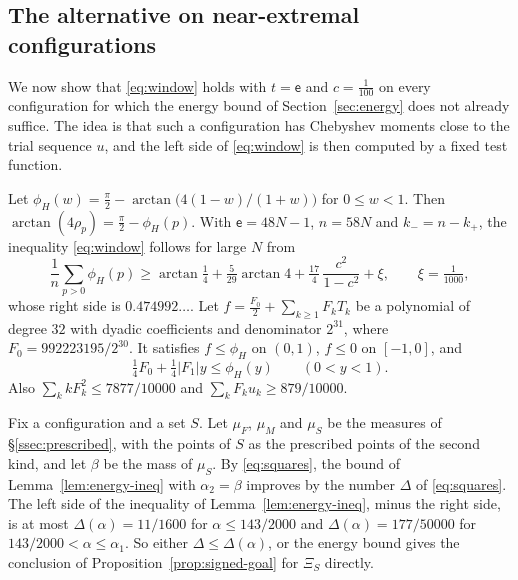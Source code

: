 \documentclass[11pt]{amsart}
\theoremstyle{definition}
\theoremstyle{remark}
\numberwithin{equation}{section}
\begin{document}
\subsection{The alternative on near-extremal configurations}\label{ssec:alternative}
We now show that \eqref{eq:window} holds with $t=\mathsf e$ and $c=\frac1{100}$ on every configuration for which the
energy bound of Section~\ref{sec:energy} does not already suffice. The idea is that such a configuration has
Chebyshev moments close to the trial sequence $u$, and the left side of \eqref{eq:window} is then computed by a
fixed test function.

Let $\phi_H(w)=\frac\pi2-\arctan\bigl(4(1-w)/(1+w)\bigr)$ for $0\le w<1$. Then $\arctan(4\rho_p)=\frac\pi2-\phi_H(p)$.
With $\mathsf e=48N-1$, $n=58N$ and $k_-=n-k_+$, the inequality \eqref{eq:window} follows for large $N$ from
\begin{equation}\label{eq:phaseneed}
 \frac1n\sum_{p>0}\phi_H(p)\ge\arctan\tfrac14+\tfrac5{29}\arctan4+\tfrac{17}4\,\frac{c^2}{1-c^2}+\xi,\qquad \xi=\tfrac1{1000},
\end{equation}
whose right side is $0.474992\ldots$. Let $f=\frac{F_0}2+\sum_{k\ge1}F_kT_k$ be a polynomial of degree $32$ with
dyadic coefficients and denominator $2^{31}$, where $F_0=992223195/2^{30}$. 
It satisfies $f\le\phi_H$ on $(0,1)$, $f\le0$ on $[-1,0]$, and
\begin{equation}\label{eq:testS}
 \tfrac14F_0+\tfrac14|F_1|y\le\phi_H(y)\qquad(0<y<1).
\end{equation}
Also $\sum_kkF_k^2\le7877/10000$ and $\sum_kF_ku_k\ge879/10000$.

Fix a configuration and a set $S$. Let $\mu_F$, $\mu_M$ and $\mu_S$ be the measures of \S\ref{ssec:prescribed}, with the points of $S$ as the
prescribed points of the second kind, and let $\beta$ be the mass of $\mu_S$. By \eqref{eq:squares}, the bound of Lemma~\ref{lem:energy-ineq} with
$\alpha_2=\beta$ improves by the number $\Delta$ of \eqref{eq:squares}. The left side of the inequality of Lemma~\ref{lem:energy-ineq}, minus the right
side, is at most $\Delta(\alpha)=11/1600$ for $\alpha\le143/2000$ and $\Delta(\alpha)=177/50000$ for
$143/2000<\alpha\le\alpha_1$. So either $\Delta\le\Delta(\alpha)$, or the energy bound gives the conclusion of
Proposition~\ref{prop:signed-goal} for $\Xi_S$ directly.
\end{document}
